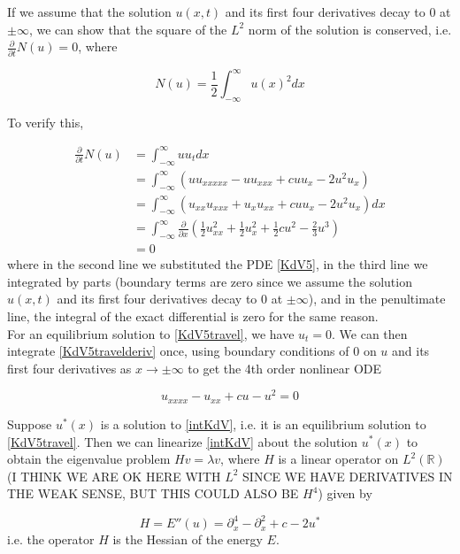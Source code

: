 \documentclass[12pt]{article}
\def\R{{\mathbb R}}
\begin{document}
If we assume that the solution $u(x, t)$ and its first four derivatives decay to 0 at $\pm \infty$, we can show that the square of the $L^2$ norm of the solution is conserved, i.e. $\frac{\partial}{\partial t}N(u) = 0$, where

\begin{equation} \label{L2norm}
N(u) = \frac{1}{2} \int_{-\infty}^\infty u(x)^2 dx
\end{equation}

To verify this, 

\begin{align*}
\frac{\partial}{\partial t} N(u) &= \int_{-\infty}^\infty u u_t dx \\
&= \int_{-\infty}^\infty \left( u u_{xxxxx} - u u_{xxx} + c u u_x - 2u^2 u_x\right) \\
&= \int_{-\infty}^\infty \left( u_{xx} u_{xxx} + u_x u_{xx} + c u u_x - 2u^2 u_x\right) dx \\
&= \int_{-\infty}^\infty \frac{\partial}{\partial x} \left( \frac{1}{2} u_{xx}^2 + \frac{1}{2} u_x^2+ \frac{1}{2} c u^2 - \frac{2}{3} u^3 \right)\\
&= 0 
\end{align*}
where in the second line we substituted the PDE \eqref{KdV5}, in the third line we integrated by parts (boundary terms are zero since we assume the solution $u(x, t)$ and its first four derivatives decay to 0 at $\pm \infty$), and in the penultimate line, the integral of the exact differential is zero for the same reason.\\

For an equilibrium solution to \eqref{KdV5travel}, we have $u_t = 0$. We can then integrate \eqref{KdV5travelderiv} once, using boundary conditions of 0 on $u$ and its first four derivatives as $x \rightarrow \pm \infty$ to get the 4th order nonlinear ODE

\begin{equation} \label{intKdV}
u_{xxxx} - u_{xx} + c u - u^2 = 0
\end{equation}

Suppose $u^*(x)$ is a solution to \eqref{intKdV}, i.e. it is an equilibrium solution to \eqref{KdV5travel}. Then we can linearize \eqref{intKdV} about the solution $u^*(x)$ to obtain the eigenvalue problem $Hv = \lambda v$, where $H$ is a linear operator on $L^2(\R)$ (I THINK WE ARE OK HERE WITH $L^2$ SINCE WE HAVE DERIVATIVES IN THE WEAK SENSE, BUT THIS COULD ALSO BE $H^4$) given by

\begin{equation}\label{linear4th}
H = E''(u) = \partial_x^4 - \partial_x^2 + c - 2 u^*
\end{equation}
i.e. the operator $H$ is the Hessian of the energy $E$.\\
\end{document}

